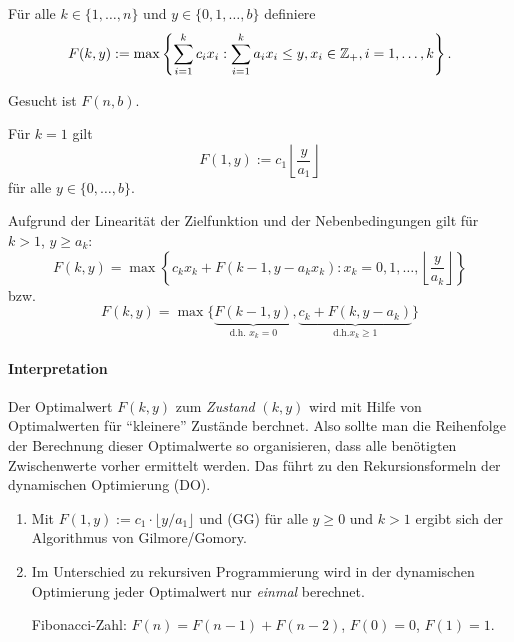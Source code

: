 \begin{defn*}
  Für alle $k \in \{1, \ldots, n\}$ und $y \in \{0,1, \ldots, b\}$ definiere
  \[ F(k,y) := \max \left\{
      \sum_{i=1}^k c_i x_i : \sum_{i=1}^k a_i x_i \le y, x_i \in \mathbb{Z}_+, i
      =1, \ldots, k
    \right\}. \]
\end{defn*}
Gesucht ist $F(n,b)$.

Für $k=1$ gilt
\[ F(1,y) := c_1 \left\lfloor \frac{y}{a_1} \right\rfloor\]
für alle $y \in \{ 0, \ldots, b \}$.

Aufgrund der Linearität der Zielfunktion und der Nebenbedingungen gilt für $k >
1$, $y \ge a_k$:
\[ F(k,y) = \max \left\{ c_k x_k + F(k-1, y - a_k x_k) : x_k = 0, 1, \ldots,
    \left\lfloor \frac{y}{a_k} \right\rfloor 
  \right\} \]
bzw.
\[ F(k,y) = \max \{
  \underbrace{F(k-1,y)}_{\text{d.h. } x_k = 0},
  \underbrace{c_k + F(k, y- a_k)}_{\text{d.h.} x_k \ge 1}
  \} \]

\paragraph{Interpretation} Der Optimalwert $F(k,y)$ zum \emph{Zustand} $(k,y)$
wird mit Hilfe von Optimalwerten für ``kleinere'' Zustände berchnet. Also sollte
man die Reihenfolge der Berechnung dieser Optimalwerte so organisieren, dass
alle benötigten Zwischenwerte vorher ermittelt werden. Das führt zu den
Rekursionsformeln der dynamischen Optimierung (DO).

\begin{rmrk*}
  \begin{enumerate}
  \item Mit $F(1,y) := c_1 \cdot \lfloor y / a_1  \rfloor$ und (GG) für alle
    $y \ge 0$ und $k > 1$ ergibt sich der Algorithmus von Gilmore/Gomory.
  \item Im Unterschied zu rekursiven Programmierung wird in der dynamischen
    Optimierung jeder Optimalwert nur \emph{einmal} berechnet.

    Fibonacci-Zahl: $F(n) = F(n-1) + F(n-2)$, $F(0) = 0$, $F(1) = 1$.
  \end{enumerate}
\end{rmrk*}

